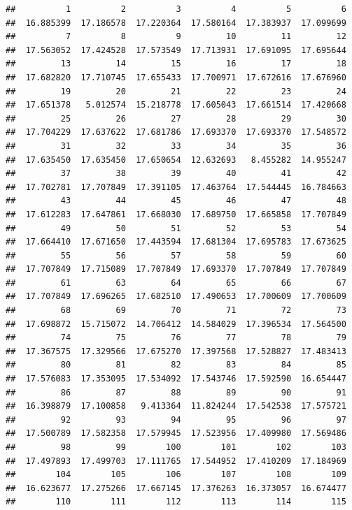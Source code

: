 \documentclass[]{report}
\begin{document}
\begin{verbatim}
##          1          2          3          4          5          6 
##  16.885399  17.186578  17.220364  17.580164  17.383937  17.099699 
##          7          8          9         10         11         12 
##  17.563052  17.424528  17.573549  17.713931  17.691095  17.695644 
##         13         14         15         16         17         18 
##  17.682820  17.710745  17.655433  17.700971  17.672616  17.676960 
##         19         20         21         22         23         24 
##  17.651378   5.012574  15.218778  17.605043  17.661514  17.420668 
##         25         26         27         28         29         30 
##  17.704229  17.637622  17.681786  17.693370  17.693370  17.548572 
##         31         32         33         34         35         36 
##  17.635450  17.635450  17.650654  12.632693   8.455282  14.955247 
##         37         38         39         40         41         42 
##  17.702781  17.707849  17.391105  17.463764  17.544445  16.784663 
##         43         44         45         46         47         48 
##  17.612283  17.647861  17.668030  17.689750  17.665858  17.707849 
##         49         50         51         52         53         54 
##  17.664410  17.671650  17.443594  17.681304  17.695783  17.673625 
##         55         56         57         58         59         60 
##  17.707849  17.715089  17.707849  17.693370  17.707849  17.707849 
##         61         63         64         65         66         67 
##  17.707849  17.696265  17.682510  17.490653  17.700609  17.700609 
##         68         69         70         71         72         73 
##  17.698872  15.715072  14.706412  14.584029  17.396534  17.564500 
##         74         75         76         77         78         79 
##  17.367575  17.329566  17.675270  17.397568  17.528827  17.483413 
##         80         81         82         83         84         85 
##  17.576083  17.353095  17.534092  17.543746  17.592590  16.654447 
##         86         87         88         89         90         91 
##  16.398879  17.100858   9.413364  11.824244  17.542538  17.575721 
##         92         93         94         95         96         97 
##  17.500789  17.582358  17.579945  17.523956  17.409980  17.569486 
##         98         99        100        101        102        103 
##  17.497893  17.499703  17.111765  17.544952  17.410209  17.184969 
##        104        105        106        107        108        109 
##  16.623677  17.275266  17.667145  17.376263  16.373057  16.674477 
##        110        111        112        113        114        115 

\end{verbatim}
\end{document}
